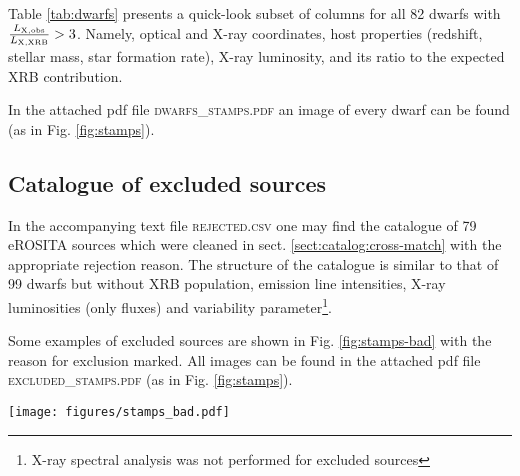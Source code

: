 \documentclass[fleqn,usenatbib]{mnras}
\newcommand{\lxlxrbrat}{\frac{L_{\rm X, obs}}{L_{\rm X, XRB}}}
\begin{document}
Table \ref{tab:dwarfs} presents a quick-look subset of columns for all 82 dwarfs with $\lxlxrbrat>3$. Namely, optical and X-ray coordinates, host properties (redshift, stellar mass, star formation rate), X-ray luminosity, and its ratio to the expected XRB contribution.

In the attached pdf file \textsc{dwarfs\_stamps.pdf} an image of every dwarf can be found (as in Fig. \ref{fig:stamps}).



\subsection{Catalogue of excluded sources}
\label{appendix:excluded}

In the accompanying text file \textsc{rejected.csv} one may find the catalogue of 79 eROSITA sources which were cleaned in sect. \ref{sect:catalog:cross-match} with the appropriate rejection reason. The structure of the catalogue is similar to that of 99 dwarfs but without XRB population, emission line intensities, X-ray luminosities (only fluxes) and variability parameter\footnote{X-ray spectral analysis was not performed for excluded sources}.

Some examples of excluded sources are shown in Fig. \ref{fig:stamps-bad} with the reason for exclusion marked. All images can be found in the attached pdf file \textsc{excluded\_stamps.pdf} (as in Fig. \ref{fig:stamps}).
\begin{figure*}
    \centering
    \texttt{[image: figures/stamps\_bad.pdf]}
    \caption[As Fig. \ref{fig:stamps}, but for excluded sources.]{As Fig. \ref{fig:stamps}, but for galaxies which were cleaned during the cross-match process. Each galaxy has an ID on the bottom left, and the reason for exclusion on the top left. All except 10738 and 36010 were removed after visual inspection, and 10738 and 36010 were removed automatically as per massive galaxy within $r_{98}$ criterion. 27303 is a notable example of a dwarf galaxy with an eROSITA source in the outskirts.}
    \label{fig:stamps-bad}
\end{figure*}

\onecolumn
\begin{landscape}
{
\fontsize{7}{9}\selectfont
%

}
\end{landscape}

\bsp	%
\label{lastpage}
\end{document}
